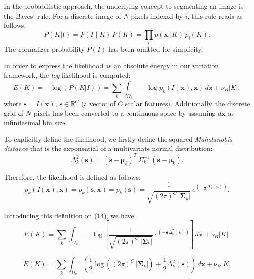 In the probabilistic approach, the underlying concept to segmenting an image is the
Bayes' rule. For a discrete image of $N$ pixels indexed by $i$, this rule reads as
follows:
\begin{equation}
P(K|I)=P(I \mid K)\, P(K)=\underset{i}{\prod} p (\mathbf{x}_i | K ) \, p_i(K).
\end{equation}
The normalizer probability $P(I)$ has been omitted for simplicity.

In order to express the likelihood as an absolute energy in our variation framework,
the \textit{log}-likelihood is computed:
\begin{equation}
E(K)= -\log( P(K|I) ) = \sum\limits_k \int_{\Omega_k} -\log p_k(I(\mathbf{x}),\mathbf{x}) \,d\mathbf{x}+\nu_B \left|K\right|,
\end{equation}
where $\mathbf{s} = I(\mathbf{x})$, $\mathbf{s} \in \mathbb{R}^C$ (a vector of $C$ scalar features).
Additionally, the discrete grid of $N$ pixels has been converted to a continuous space by assuming
$d\mathbf{x}$ as infinitesimal bin size.

To explicitly define the likelihood, we firstly define the squared \textit{Mahalanobis distance} that
is the exponential of a multivariate normal distribution:
\begin{equation}
\Delta^2_k (\mathbf{s}) = (\mathbf{s} - \boldsymbol{\mu}_k)^T \, \Sigma^{-1}_k \, (\mathbf{s} - \boldsymbol{\mu}_k).
\end{equation}

Therefore, the likelihood is defined as follows:
\begin{equation}
p_k(I(\mathbf{x}),\mathbf{x}) = p_k(\mathbf{s},\mathbf{x})= p_k(\mathbf{s}) = \frac{1}{ \sqrt{(2\pi)^{C}\,\left|\boldsymbol{\Sigma}_{k}\right|}}\,{e^{\left(-\frac{1}{2}  \Delta^2_k (\mathbf{s}) \right)}}.
\end{equation}

Introducing this definition on (14), we have:
\begin{equation}
E(K)= \sum\limits_k \int_{\Omega_k} -\log{\left[ \frac{1}{ \sqrt{(2\pi)^{C}\,\left|\boldsymbol{\Sigma}_{k}\right|}}\,e^{\left(-\frac{1}{2}  \Delta^2_k (\mathbf{s}) \right)} \right] } \,d\mathbf{x}+\nu_B \left|K\right|.
\end{equation}

\begin{equation}
E(K) = \sum\limits_k \int_{\Omega_k} \left( \frac{1}{2} \log{ \left( (2\pi)^{C}\,\left|\boldsymbol{\Sigma}_{k}\right| \right)} + \frac{1}{2}  \Delta^2_k (\mathbf{s}) \right) \,d\mathbf{x}+\nu_B \left|K\right|
\end{equation}

